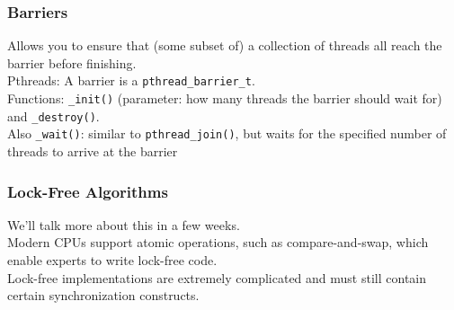 \documentclass[aspectratio=43]{beamer}
\newenvironment{changemargin}[1]{%
  \begin{list}{}{%
    \setlength{\topsep}{0pt}%
    \setlength{\leftmargin}{#1}%
    \setlength{\rightmargin}{1em}
    \setlength{\listparindent}{\parindent}%
    \setlength{\itemindent}{\parindent}%
    \setlength{\parsep}{\parskip}%
  }%
  \item[]}{\end{list}}
\begin{document}
\begin{frame}
  \frametitle{Barriers}

  \begin{changemargin}{2.5cm}
    Allows you to ensure that (some subset of) a collection 
    of threads all reach the barrier before finishing.\\[1em]

    Pthreads: A barrier is a {\tt pthread\_barrier\_t}.\\[1em]

    Functions: {\tt \_init()} (parameter: how many threads the barrier
    should wait for) and {\tt \_destroy()}.\\[1em]

    Also {\tt \_wait()}: similar to {\tt pthread\_join()}, but waits
      for the specified number of threads to arrive at the barrier
  \end{changemargin}
\end{frame}

\begin{frame}
  \frametitle{Lock-Free Algorithms}

  \begin{changemargin}{2.5cm}
    We'll talk more about this in a few weeks.\\[1em]

    Modern CPUs support atomic operations, such as compare-and-swap, which
enable experts to write lock-free code.\\[1em]

    Lock-free implementations are extremely complicated and must still contain certain synchronization constructs.
  \end{changemargin}
\end{frame}
\end{document}
